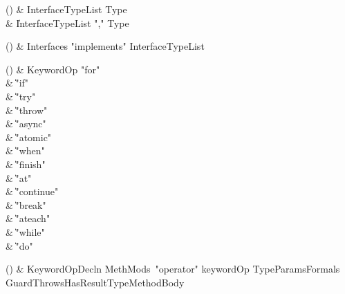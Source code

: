 \begin{bbgrammarappendix}{3.3in}

() & InterfaceTypeList \label{prod:InterfaceTypeList}  \: Type  \\

 &    \| InterfaceTypeList \xcd"," Type \\

\end{bbgrammarappendix}

\begin{bbgrammarappendix}{4.0in}

() & Interfaces \label{prod:Interfaces}  \: \xcd"implements" InterfaceTypeList  \\


\end{bbgrammarappendix}

\begin{bbgrammarappendix}{3.8in}

() & KeywordOp \label{prod:KeywordOp}  \:
         \xcd"for" \\
 &    \| \xcd"if" \\
 &    \| \xcd"try" \\
 &    \| \xcd"throw" \\
 &    \| \xcd"async" \\
 &    \| \xcd"atomic" \\
 &    \| \xcd"when" \\
 &    \| \xcd"finish" \\
 &    \| \xcd"at" \\
 &    \| \xcd"continue" \\
 &    \| \xcd"break" \\
 &    \| \xcd"ateach" \\
 &    \| \xcd"while" \\
 &    \| \xcd"do" \\

\end{bbgrammarappendix}

\begin{bbgrammarappendix}{3.9in}

() & KeywordOpDecln \label{prod:KeywordOpDecln}  \:
  MethMods\ \xcd"operator" keywordOp TypeParams\opt Formals Guard\opt Throws\opt HasResultType\opt MethodBody

\end{bbgrammarappendix}


